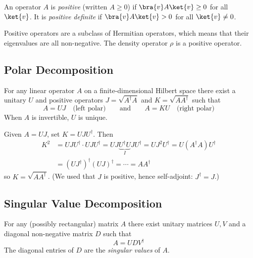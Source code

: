 \documentclass[oneside]{academica}
\begin{document}
\begin{definition*}
  An operator $A$ is \emph{positive} (written $A\ge0$) if $\bra{v}A\ket{v}\ge0$ for all $\ket{v}$.
  It is \emph{positive definite} if $\bra{v}A\ket{v}>0$ for all $\ket{v}\neq0$.
\end{definition*}
Positive operators are a subclass of Hermitian operators, which means that their eigenvalues are all non-negative.
The density operator $\rho$ is a positive operator.

\subsection{Polar Decomposition}

\begin{definition*}
  For any linear operator $A$ on a finite-dimensional Hilbert space there exist a unitary $U$ and positive operators $J=\sqrt{A^\dagger A}$ and $K=\sqrt{AA^\dagger}$ such that
  \begin{equation*}
    A = UJ \quad\text{(left polar)}\qquad\text{and}\qquad A = KU \quad\text{(right polar)}
  \end{equation*}
  When $A$ is invertible, $U$ is unique.
\end{definition*}

\begin{proof*}
  Given $A=UJ$, set $K=UJU^\dagger$.
Then
  \begin{align*}
    K^2 &= UJU^\dagger\cdot UJU^\dagger = UJ\underbrace{U^\dagger U}_{I}JU^\dagger = UJ^2U^\dagger = U(A^\dagger A)U^\dagger \\
    &= (UJ^\dagger)^\dagger(UJ)^\dagger = \cdots = AA^\dagger
  \end{align*}
  so $K=\sqrt{AA^\dagger}$.
(We used that $J$ is positive, hence self-adjoint: $J^\dagger=J$.)
\end{proof*}

\subsection{Singular Value Decomposition}

\begin{definition*}
  For any (possibly rectangular) matrix $A$ there exist unitary matrices $U,V$ and a diagonal non-negative matrix $D$ such that
  \begin{equation*}
    A = UDV^\dagger
  \end{equation*}
  The diagonal entries of $D$ are the \emph{singular values} of $A$.
\end{definition*}
\end{document}
